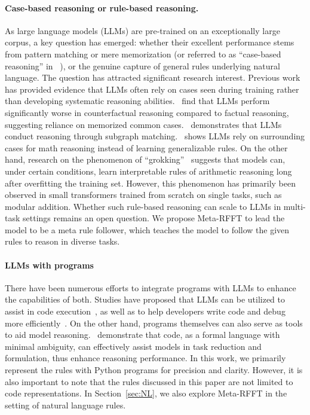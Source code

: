 \paragraph{Case-based reasoning or rule-based reasoning.} 
As large language models (LLMs) are pre-trained on an exceptionally large corpus, a key question has emerged: whether their excellent performance stems from pattern matching or mere memorization (or referred to as ``case-based reasoning'' in ~\citet{hu2024casebasedrulebasedtransformersmath}), or the genuine capture of general rules underlying natural language. The question has attracted significant research interest. Previous work has provided evidence that LLMs often rely on cases seen during training rather than developing systematic reasoning abilities.~\citet{wu2023reasoning-or-reciting, zhang2023counterfactual} find that LLMs perform significantly worse in counterfactual reasoning compared to factual reasoning, suggesting reliance on memorized common cases.~\citet{dziri2023faith} demonstrates that LLMs conduct reasoning through subgraph matching.~\citet{hu2024casebasedrulebasedtransformersmath} shows LLMs rely on surrounding cases for math reasoning instead of learning generalizable rules. 
On the other hand, research on the phenomenon of ``grokking''~\citep{power2022grokking, liu2022understanding, nanda2023progress, zhong2023clock} suggests that models can, under certain conditions, learn interpretable rules of arithmetic reasoning long after overfitting the training set. However, this phenomenon has primarily been observed in small transformers trained from scratch on single tasks, such as modular addition. Whether such rule-based reasoning can scale to LLMs in multi-task settings remains an open question. We propose Meta-RFFT to lead the model to be a meta rule follower, which teaches the model to follow the given rules to reason in diverse tasks.

\paragraph{LLMs with programs}
There have been numerous efforts to integrate programs with LLMs to enhance the capabilities of both. Studies have proposed that LLMs can be utilized to assist in code execution~\citep{li2024chaincodereasoninglanguage}, as well as to help developers write code and debug more efficiently~\citep{jimenez2024swebenchlanguagemodelsresolve, yang2024swebenchmultimodalaisystems, wang2024openhandsopenplatformai}. On the other hand, programs themselves can also serve as tools to aid model reasoning.~\citet{gao2023palprogramaidedlanguagemodels, chen2023programthoughtspromptingdisentangling, hu2023codepromptingneuralsymbolic, li2024chaincodereasoninglanguage, nye2021workscratchpadsintermediatecomputation} demonstrate that code, as a formal language with minimal ambiguity, can effectively assist models in task reduction and formulation, thus enhance reasoning performance.
In this work, we primarily represent the rules with Python programs for precision and clarity. However, it is also important to note that the rules discussed in this paper are not limited to code representations. In Section~\ref{sec:NL}, we also explore Meta-RFFT in the setting of natural language rules. 

